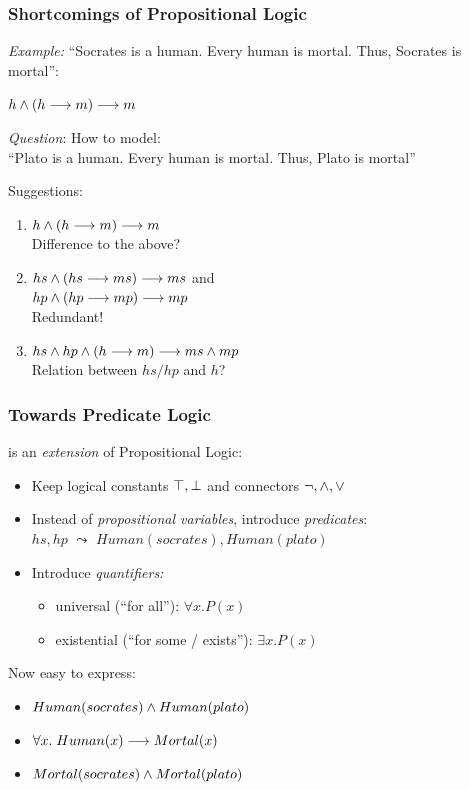 \documentclass{beamer}
\begin{document}
\begin{frame}[fragile]\frametitle{Shortcomings of Propositional Logic}

  \emph{Example:} ``Socrates is a human. Every human is mortal. Thus, Socrates is mortal'':

  $h \wedge (h \longrightarrow m) \longrightarrow m$

  \vspace{3mm}

  \emph{Question}: How to model: \\
  ``Plato is a human. Every human is mortal. Thus, Plato is mortal''

  \vspace{3mm}
  Suggestions:
  \begin{enumerate}
  \item $h \wedge (h \longrightarrow m) \longrightarrow m$\\
    Difference to the above?
  \item $hs \wedge (hs \longrightarrow ms) \longrightarrow ms$ and\\
    $hp \wedge (hp \longrightarrow mp) \longrightarrow mp$\\
    Redundant!
  \item $hs \wedge hp \wedge (h \longrightarrow m) \longrightarrow ms \wedge mp$\\
    Relation between $hs / hp$ and $h$?
  \end{enumerate}

\end{frame}

\begin{frame}[fragile]\frametitle{Towards Predicate Logic}

   is an \emph{extension} of Propositional Logic:
  \begin{itemize}
  \item Keep logical constants $\top, \perp$ and connectors $\neg, \wedge, \vee$
  \item Instead of \emph{propositional variables}, introduce \emph{predicates}:\\
    $hs, hp$ $\leadsto$ $Human(socrates), Human(plato)$
  \item Introduce \emph{quantifiers:}
    \begin{itemize}
    \item universal (``for all''): $\forall x. P(x)$
    \item existential (``for some / exists''): $\exists x. P(x)$
    \end{itemize}
  \end{itemize}

  Now easy to express:

  \begin{itemize}
  \item $Human(socrates) \wedge Human(plato)$
  \item $\forall x.\; Human(x) \longrightarrow Mortal(x)$
  \item $Mortal(socrates) \wedge Mortal(plato)$
  \end{itemize}

\end{frame}
\end{document}
